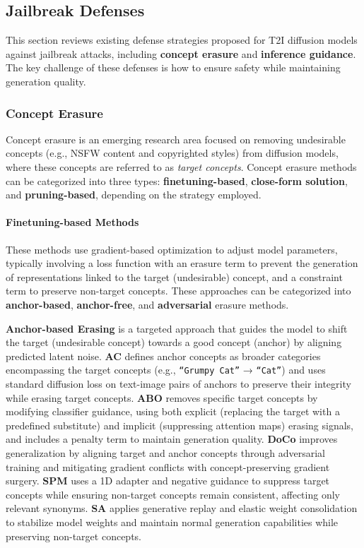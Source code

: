 \subsection{Jailbreak Defenses}
\label{sec:dm_jailbreak_defenses}

This section reviews existing defense strategies proposed for T2I diffusion models against jailbreak attacks, including \textbf{concept erasure} and \textbf{inference guidance}. 
The key challenge of these defenses is how to ensure safety while maintaining generation quality.


\subsubsection{Concept Erasure} 
Concept erasure is an emerging research area focused on removing undesirable concepts (e.g., NSFW content and copyrighted styles) from diffusion models, where these concepts are referred to as \emph{target concepts}. Concept erasure methods can be categorized into three types: \textbf{finetuning-based}, \textbf{close-form solution}, and \textbf{pruning-based}, depending on the strategy employed.

\paragraph{Finetuning-based Methods} 
These methods use gradient-based optimization to adjust model parameters, typically involving a loss function with an erasure term to prevent the generation of representations linked to the target (undesirable) concept, and a constraint term to preserve non-target concepts. These approaches can be categorized into \textbf{anchor-based}, \textbf{anchor-free}, and \textbf{adversarial} erasure methods.


\textbf{Anchor-based Erasing} is a targeted approach that guides the model to shift the target (undesirable concept) towards a good concept (anchor) by aligning predicted latent noise. \textbf{AC} \cite{kumari2023ablating} defines anchor concepts as broader categories encompassing the target concepts (e.g., \texttt{“Grumpy Cat”} → \texttt{“Cat”}) and uses standard diffusion loss on text-image pairs of anchors to preserve their integrity while erasing target concepts. 
\textbf{ABO} \cite{hong2024all} removes specific target concepts by modifying classifier guidance, using both explicit (replacing the target with a predefined substitute) and implicit (suppressing attention maps) erasing signals, and includes a penalty term to maintain generation quality. 
\textbf{DoCo} \cite{wu2024unlearning} improves generalization by aligning target and anchor concepts through adversarial training and mitigating gradient conflicts with concept-preserving gradient surgery. \textbf{SPM} \cite{lyu2024one} uses a 1D adapter and negative guidance \cite{gandikota2023erasing} to suppress target concepts while ensuring non-target concepts remain consistent, affecting only relevant synonyms. 
\textbf{SA} \cite{heng2024selective} applies generative replay and elastic weight consolidation to stabilize model weights and maintain normal generation capabilities while preserving non-target concepts.


